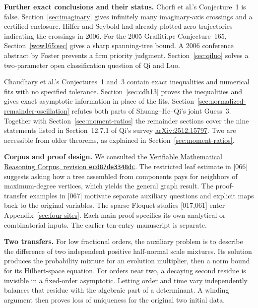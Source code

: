 \documentclass[11pt,a4paper]{article}
\numberwithin{equation}{section}
\begin{document}
\clearpage
\noindent\textbf{Further exact conclusions and their status.}
Chorfi et al.'s Conjecture~1 is false. Section~\ref{sec:imaginary}
gives infinitely many imaginary-axis crossings and a certified
enclosure. Hilfer and Seybold had already plotted zero trajectories
indicating the crossings in 2006. For the 2005 Graffiti.pc
Conjecture~165, Section~\ref{wow165:sec} gives a sharp spanning-tree
bound. A 2006 conference abstract by Foster prevents a firm priority
judgment. Section~\ref{sec:qiluo} solves a two-parameter open
classification question of Qi and Luo.

Chaudhary et al.'s Conjectures~1 and~3 contain exact inequalities and
numerical fits with no specified tolerance. Section~\ref{sec:cdh13}
proves the inequalities and gives exact asymptotic information in place
of the fits. Section~\ref{sec:normalized-remainder-oscillation}
refutes both parts of Shuang--He--Qi's joint Guess~3. Together with
Section~\ref{sec:moment-ratios} the remainder sections cover the
nine statements listed in Section~12.7.1 of Qi's survey
\href{https://arxiv.org/abs/2512.15797}{arXiv:2512.15797}.
Two are accessible from older theorems, as explained in
Section~\ref{sec:moment-ratios}.

\medskip
\noindent\textbf{Corpus and proof design.}
We consulted the \href{https://github.com/QEEDDD/Verifiable-Mathematical-Reasoning-Corpus/commit/ecd87de3348dcb706a76bb12fde722d7a348a012}{Verifiable Mathematical Reasoning Corpus,
revision \texttt{ecd87de3348dc}}. The restricted leaf estimate in [066]
suggests asking how a tree assembled from components pays for neighbors
of maximum-degree vertices, which yields the general graph result.
The proof-transfer examples in [067] motivate separate auxiliary
questions and explicit maps back to the original variables.
The sparse Floquet studies [017,061] enter Appendix~\ref{sec:four-sites}.
Each main proof specifies its own analytical or combinatorial inputs.
The earlier ten-entry manuscript is separate.

\medskip
\noindent\textbf{Two transfers.}
For low fractional orders, the auxiliary problem is to describe the
difference of two independent positive half-normal scale mixtures.
Its solution produces the probability mixture for an evolution
multiplier, then a norm bound for its Hilbert-space equation. For
orders near two, a decaying second residue is invisible in a fixed-order
asymptotic. Letting order and time vary independently balances that
residue with the algebraic part of a determinant. A winding argument
then proves loss of uniqueness for the original two initial data.
\medskip
\end{document}
